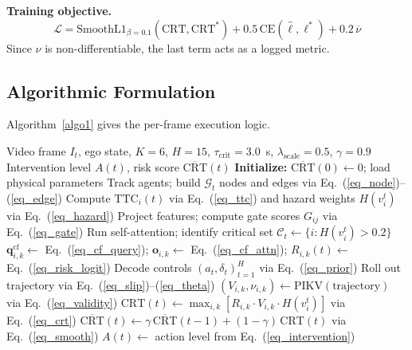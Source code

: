 \documentclass[preprint,12pt]{elsarticle}
\begin{document}
\textbf{Training objective.}
\begin{equation}
    \mathcal{L} = \text{SmoothL1}_{\beta = 0.1}(\text{CRT}, \text{CRT}^{*}) + 0.5 \, \text{CE}(\hat{\ell}, \ell^{*}) + 0.2 \, \overline{\nu}
    \label{eq_loss}
\end{equation}
Since $\nu$ is non-differentiable, the last term acts as a logged metric.

\subsection{Algorithmic Formulation}
Algorithm~\ref{algo1} gives the per-frame execution logic.

\begin{algorithm}[H]
	\caption{PC-CSG Counterfactual Anomaly Anticipation Pipeline}
	\begin{algorithmic}[1]
		\Require Video frame $I_t$, ego state, $K=6$, $H=15$, $\tau_{\text{crit}}=3.0$~s, $\lambda_{\text{scale}}=0.5$, $\gamma = 0.9$
		\Ensure Intervention level $A(t)$, risk score $\overline{\text{CRT}}(t)$
		\State \textbf{Initialize:} $\overline{\text{CRT}}(0) \gets 0$; load physical parameters
			\State Track agents; build $\mathcal{G}_t$ nodes and edges via Eq.~(\ref{eq_node})--(\ref{eq_edge})
			\State Compute $\text{TTC}_i(t)$ via Eq.~(\ref{eq_ttc}) and hazard weights $H(v_i^t)$ via Eq.~(\ref{eq_hazard})
			\State Project features; compute gate scores $G_{ij}$ via Eq.~(\ref{eq_gate})
			\State Run self-attention; identify critical set $\mathcal{C}_t \gets \{i : H(v_i^t) > 0.2\}$
				\State $\mathbf{q}_{i,k}^{\text{cf}} \gets$ Eq.~(\ref{eq_cf_query}); \; $\mathbf{o}_{i,k} \gets$ Eq.~(\ref{eq_cf_attn}); \; $R_{i,k}(t) \gets$ Eq.~(\ref{eq_risk_logit})
				\State Decode controls $(a_t, \delta_t)_{t=1}^{H}$ via Eq.~(\ref{eq_prior})
				\State Roll out trajectory via Eq.~(\ref{eq_slip})--(\ref{eq_theta})
				\State $(V_{i,k}, \nu_{i,k}) \gets \text{PIKV}(\text{trajectory})$ via Eq.~(\ref{eq_validity})
			\EndFor
			\State $\text{CRT}(t) \gets \max_{i,k} [R_{i,k} \cdot V_{i,k} \cdot H(v_i^t)]$ via Eq.~(\ref{eq_crt})
			\State $\overline{\text{CRT}}(t) \gets \gamma \, \overline{\text{CRT}}(t-1) + (1-\gamma) \, \text{CRT}(t)$ via Eq.~(\ref{eq_smooth})
			\State $A(t) \gets$ action level from Eq.~(\ref{eq_intervention})
		\EndFor
	\end{algorithmic}
	\label{algo1}
\end{algorithm}
\end{document}
